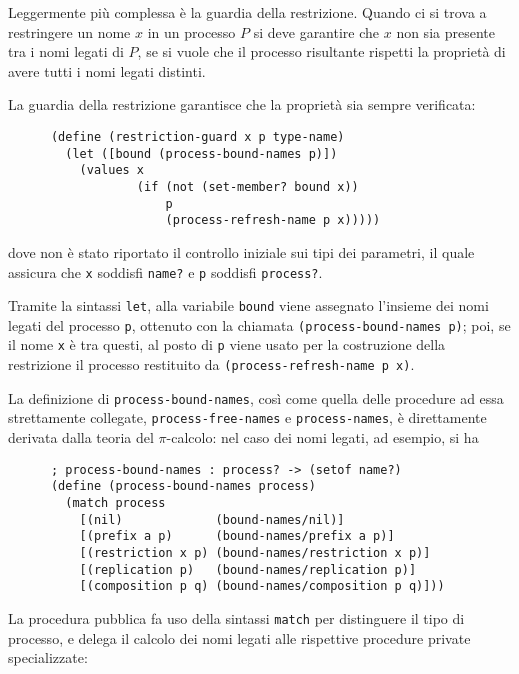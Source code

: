 Leggermente pi\`u complessa \`e la guardia della restrizione. Quando ci si
trova a restringere un nome $x$ in un processo $P$ si deve garantire che
$x$ non sia presente tra i nomi legati di $P$, se si vuole che il processo
risultante rispetti la propriet\`a di avere tutti i nomi legati distinti.

La guardia della restrizione garantisce che la propriet\`a sia sempre
verificata:

\begin{lstlisting}
      (define (restriction-guard x p type-name)
        (let ([bound (process-bound-names p)])
          (values x
                  (if (not (set-member? bound x))
                      p
                      (process-refresh-name p x)))))
\end{lstlisting}

dove non \`e stato riportato il controllo iniziale sui tipi dei parametri,
il quale assicura che \lstinline{x} soddisfi \lstinline{name?} e
\lstinline{p} soddisfi \lstinline{process?}.

Tramite la sintassi \lstinline{let}, alla variabile \lstinline{bound} viene
assegnato l'insieme dei nomi legati del processo \lstinline{p}, ottenuto
con la chiamata \lstinline{(process-bound-names p)}; poi, se il nome
\lstinline{x} \`e tra questi, al posto di \lstinline{p} viene usato per la
costruzione della restrizione il processo restituito da
\lstinline{(process-refresh-name p x)}.

La definizione di \lstinline{process-bound-names}, cos\`i come quella delle
procedure ad essa strettamente collegate, \lstinline{process-free-names} e
\lstinline{process-names}, \`e direttamente derivata dalla teoria del
$\pi$-calcolo: nel caso dei nomi legati, ad esempio, si ha

\begin{lstlisting}
      ; process-bound-names : process? -> (setof name?)
      (define (process-bound-names process)
        (match process
          [(nil)             (bound-names/nil)]
          [(prefix a p)      (bound-names/prefix a p)]
          [(restriction x p) (bound-names/restriction x p)]
          [(replication p)   (bound-names/replication p)]
          [(composition p q) (bound-names/composition p q)]))
\end{lstlisting}

La procedura pubblica fa uso della sintassi \lstinline{match} per distinguere
il tipo di processo, e delega il calcolo dei nomi legati alle rispettive
procedure private specializzate:

